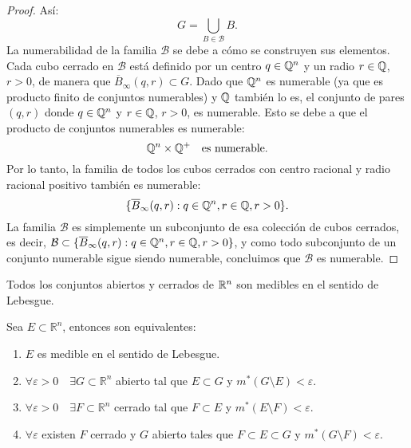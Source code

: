 \begin{proof}
    Así:
    \[
        G = \bigcup_{B \in \mathcal{B}} B.
    \]
    La numerabilidad de la familia $\mathcal{B}$ se debe a cómo se construyen sus elementos. Cada cubo cerrado en $\mathcal{B}$ está definido por un centro $q \in \mathbb{Q}^n$ y un radio $r \in \mathbb{Q}$, $r>0$, de manera que $\overline{B}_\infty(q, r) \subset G$. Dado que $\mathbb{Q}^n$ es numerable (ya que es producto finito de conjuntos numerables) y $\mathbb{Q}$ también lo es, el conjunto de pares $(q, r)$ donde $q \in \mathbb{Q}^n$ y $r \in \mathbb{Q}$, $r>0$, es numerable. Esto se debe a que el producto de conjuntos numerables es numerable:
    \[
        \mathbb{Q}^n \times \mathbb{Q}^+ \quad \text{es numerable}.
    \]
    Por lo tanto, la familia de todos los cubos cerrados con centro racional y radio racional positivo también es numerable:
    \[
        \{ \overline{B}_\infty(q, r) : q \in \mathbb{Q}^n, r \in \mathbb{Q}, r>0 \}.
    \]
    La familia $\mathcal{B}$ es simplemente un subconjunto de esa colección de cubos cerrados, es decir, $\mathcal{B} \subset \{ \overline{B}_\infty(q, r) : q \in \mathbb{Q}^n, r \in \mathbb{Q}, r>0 \}$, y como todo subconjunto de un conjunto numerable sigue siendo numerable, concluimos que $\mathcal{B}$ es numerable.
\end{proof}


\begin{corolario}
    Todos los conjuntos abiertos y cerrados de $\mathbb{R}^n$ son medibles en el sentido de Lebesgue.
    \label{abiertoMedible}
\end{corolario}

\begin{teorema} 
    Sea $E \subset \mathbb{R}^n$, entonces son equivalentes:
    \begin{enumerate}
        \item $E$ es medible en el sentido de Lebesgue.
        \item $\forall \varepsilon > 0 \quad \exists G \subset \mathbb{R}^n$ abierto tal que $E \subset G$ y $m^*(G \setminus E) < \varepsilon$.
        \item $\forall \varepsilon > 0 \quad \exists F \subset \mathbb{R}^n$ cerrado tal que $F \subset E$ y $m^*(E \setminus F) < \varepsilon$.
        \item $\forall \varepsilon$ existen $F$ cerrado y $G$ abierto tales que $F \subset E \subset G$ y $m^*(G \setminus F) < \varepsilon$.
    \end{enumerate}
\end{teorema}

